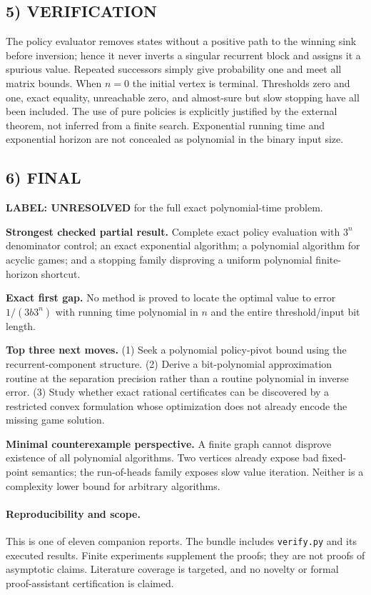 \documentclass[11pt,a4paper]{article}
\theoremstyle{definition}
\theoremstyle{remark}
\begin{document}
\subsection*{5) VERIFICATION}
The policy evaluator removes states without a positive path to the winning sink before inversion; hence it never inverts a singular recurrent block and assigns it a spurious value. Repeated successors simply give probability one and meet all matrix bounds. When $n=0$ the initial vertex is terminal. Thresholds zero and one, exact equality, unreachable zero, and almost-sure but slow stopping have all been included. The use of pure policies is explicitly justified by the external theorem, not inferred from a finite search. Exponential running time and exponential horizon are not concealed as polynomial in the binary input size.

\subsection*{6) FINAL}
\textbf{LABEL: UNRESOLVED} for the full exact polynomial-time problem.

\textbf{Strongest checked partial result.} Complete exact policy evaluation with $3^n$ denominator control; an exact exponential algorithm; a polynomial algorithm for acyclic games; and a stopping family disproving a uniform polynomial finite-horizon shortcut.

\textbf{Exact first gap.} No method is proved to locate the optimal value to error $1/(3b3^n)$ with running time polynomial in $n$ and the entire threshold/input bit length.

\textbf{Top three next moves.} (1) Seek a polynomial policy-pivot bound using the recurrent-component structure. (2) Derive a bit-polynomial approximation routine at the separation precision rather than a routine polynomial in inverse error. (3) Study whether exact rational certificates can be discovered by a restricted convex formulation whose optimization does not already encode the missing game solution.

\textbf{Minimal counterexample perspective.} A finite graph cannot disprove existence of all polynomial algorithms. Two vertices already expose bad fixed-point semantics; the run-of-heads family exposes slow value iteration. Neither is a complexity lower bound for arbitrary algorithms.

\paragraph{Reproducibility and scope.} This is one of eleven companion reports. The bundle includes \texttt{verify.py} and its executed results. Finite experiments supplement the proofs; they are not proofs of asymptotic claims. Literature coverage is targeted, and no novelty or formal proof-assistant certification is claimed.
\end{document}
